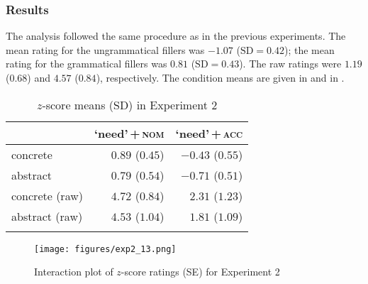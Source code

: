 \documentclass[output=paper]{langscibook}
\begin{document}
\subsubsection{Results}

The analysis followed the same procedure as in the previous experiments. The mean rating for the ungrammatical fillers was $-1.07$ ($\text{SD} =0.42$); the mean rating for the grammatical fillers was $0.81$ ($\text{SD} =0.43$). The raw ratings were $1.19$ ($0.68$) and $4.57$ ($0.84$), respectively. The condition means are given in  and in . %


\begin{table}
\centering
\begin{tabular}{lrr}
\lsptoprule
   & `need'\,+\,\textsc{nom} & `need'\,+\,\textsc{acc}\\
\midrule
concrete  &   $0.89$ ($0.45$) &   $-0.43$ ($0.55$)\\
abstract  &   $0.79$ ($0.54$) &   $-0.71$ ($0.51$)\\
concrete (raw)  &   $4.72$ ($0.84$) &   $2.31$ ($1.23$)\\
abstract (raw) &   $4.53$ ($1.04$) &   $1.81$ ($1.09$)\\
\lspbottomrule
\end{tabular}
\caption{$z$-score means (SD) in Experiment 2}
\label{tab:1:means-exp2}
\end{table}

\begin{figure}
\caption{Interaction plot of $z$-score ratings (SE) for Experiment 2}
\centering
\texttt{[image: figures/exp2\_13.png]}
\label{fig:exp2}
\end{figure}
\end{document}
